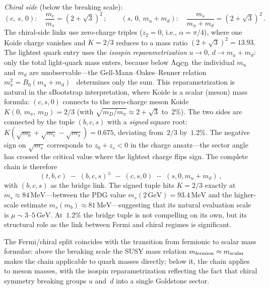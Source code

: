 \documentclass[12pt,a4paper]{article}
\makeatletter
\newcommand{\MeV}{\,\mathrm{MeV}}
\newcommand{\GeV}{\,\mathrm{GeV}}
\newcommand{\ie}{i.e.\@}
\makeatother
\begin{document}
\noindent
\emph{Chiral side} (below the breaking scale):
\begin{equation}
  (c,\,s,\,0):\quad \frac{m_c}{m_s} = (2{+}\sqrt{3})^2\,;
  \qquad
  (s,\,0,\,m_u{+}m_d):\quad \frac{m_s}{m_u{+}m_d} = (2{+}\sqrt{3})^2\,.
  \label{eq:chain_chiral}
\end{equation}
The chiral-side links use zero-charge triples ($z_2 = 0$, \ie,
$\alpha = \pi/4$), where one Koide charge vanishes and
$K = 2/3$ reduces to a mass ratio $(2{+}\sqrt{3})^2 = 13.93$.
The lightest quark entry uses the \emph{isospin
reparametrization} $u \to 0$, $d \to m_u + m_d$: only the
total light-quark mass enters, because below $\Lambda_{\rm QCD}$
the individual $m_u$ and $m_d$ are unobservable---the
Gell-Mann--Oakes--Renner relation
$m_\pi^2 = B_0(m_u{+}m_d)$~\cite{GellMannOakesRenner:1968}
determines only the sum.
This reparametrization is natural in the sBootstrap interpretation,
where Koide is a scalar (meson) mass formula:
$(c,s,0)$ connects to the zero-charge meson Koide
$K(0,\, m_\pi,\, m_D) = 2/3$ (with $\sqrt{m_D/m_\pi} \approx
2{+}\sqrt{3}$ to~$2\%$).
The two sides are connected by the tuple $(b,c,s)$ with a
\emph{signed} square root: $K(\sqrt{m_b} + \sqrt{m_c} - \sqrt{m_s})
= 0.675$, deviating from~$2/3$ by~$1.2\%$.
The negative sign on $\sqrt{m_s}$ corresponds to
$z_0 + z_s < 0$ in the charge ansatz---the sector angle has crossed
the critical value where the lightest charge flips sign.
The complete chain is therefore
\begin{equation}
  (t,b,c) \;-\; (b,c,s)^{\pm} \;-\; (c,s,0) \;-\; (s,0,m_u{+}m_d)\,,
  \label{eq:fullchain}
\end{equation}
with $(b,c,s)$ as the bridge link. The signed tuple
hits $K = 2/3$ exactly at $m_s \approx 84\MeV$---between
the PDG value $m_s(2\GeV) = 93.4\MeV$ and the higher-scale
estimate $m_s(m_b) \approx 81\MeV$---suggesting that its
natural evaluation scale is $\mu \sim 3$--$5\GeV$.
At~$1.2\%$ the bridge tuple is not compelling on its own,
but its structural role as the link between Fermi and chiral
regimes is significant.

The Fermi/chiral split coincides with the transition from
fermionic to scalar mass formulae: above the breaking scale
the SUSY mass relation $m_{\rm fermion} \approx m_{\rm scalar}$
makes the chain applicable to quark masses directly; below it,
the chain applies to meson masses, with the isospin
reparametrization reflecting the fact that chiral symmetry
breaking groups $u$ and~$d$ into a single Goldstone sector.
\end{document}
